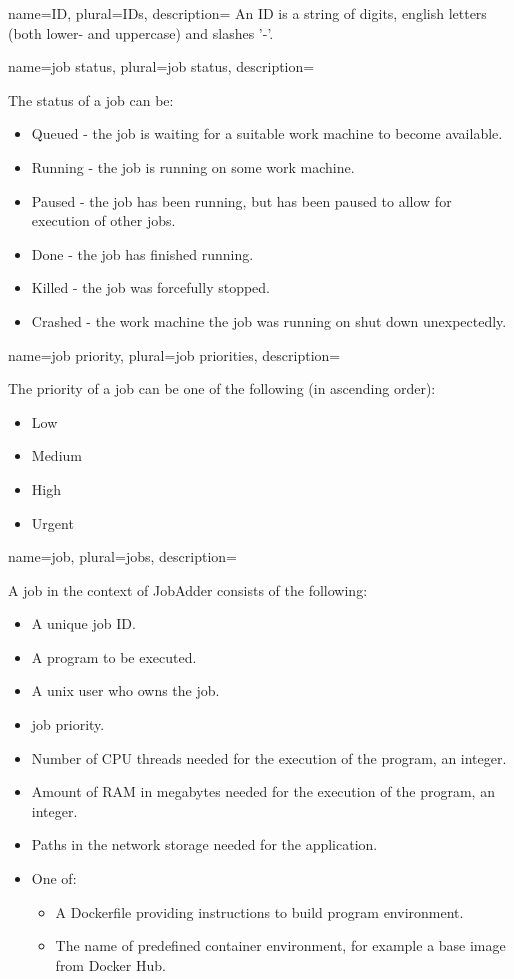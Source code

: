{
  name=ID,
  plural=IDs,
  description={
    An ID is a string of digits, english letters (both lower- and uppercase) and slashes '-'.
  }
}
{
  name=job status,
  plural=job status,
  description={
    The status of a job can be:
    \begin{itemize}
      \item Queued - the job is waiting for a suitable work machine to become available.
      \item Running - the job is running on some work machine.
      \item Paused - the job has been running, but has been paused to allow for execution of other jobs.
      \item Done - the job has finished running.
      \item Killed - the job was forcefully stopped.
      \item Crashed - the work machine the job was running on shut down unexpectedly.
    \end{itemize}
  }
}
{
  name=job priority,
  plural=job priorities,
  description={
    The priority of a job can be one of the following (in ascending order):
    \begin{itemize}
      \item Low
      \item Medium
      \item High
      \item Urgent
    \end{itemize}
  }
}
{
  name=job,
  plural=jobs,
  description={
      A job in the context of JobAdder consists of the following:
      \begin{itemize}
        \item A unique job \gls{ID}.
        \item A program to be executed.
        \item A unix user who owns the job.
        \item \Gls{job priority}.
        \item Number of CPU threads needed for the execution of the program, an integer.
        \item Amount of RAM in megabytes needed for the execution of the program, an integer.
        \item Paths in the network storage needed for the application.
        \item One of:
        \begin{itemize}
          \item A Dockerfile providing instructions to build program environment.
          \item The name of predefined container environment, for example a base image from Docker Hub.
        \end{itemize}
     \end{itemize}
  }
}
